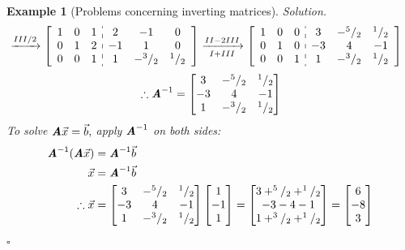 \documentclass[12pt, a4paper]{article}
\newtheorem{eg}{Example}[subsection]
\newenvironment*{sol}{\indent\textit{Solution. }}{\hfill{$\square$}\par}
\def\vecx{\vec{x}}
\def\vecb{\vec{b}}
\def\matrixA{\textbf{\emph{A}}}
\begin{document}
\begin{eg}[Problems concerning inverting matrices]
\begin{sol}
$$\begin{aligned}
			&\xrightarrow[]{III/2}\left[\begin{array}{c:c}\begin{matrix}1&0&1\\0&1&2\\0&0&1\end{matrix}&\begin{matrix}2&-1&0\\-1&1&0\\1&-^3/_2&^1/_2\end{matrix}\end{array}\right]\xrightarrow[I+III]{II-2III}\left[\begin{array}{c:c}\begin{matrix}1&0&0\\0&1&0\\0&0&1\end{matrix}&\begin{matrix}3&-^5/_2&^1/_2\\-3&4&-1\\1&-^3/_2&^1/_2\end{matrix}\end{array}\right]
		\end{aligned}$$
		\[\therefore\matrixA^{-1}=\begin{bmatrix}3&-^5/_2&^1/_2\\-3&4&-1\\1&-^3/_2&^1/_2\end{bmatrix}\]
		To solve $\matrixA\vecx=\vecb,$ apply $\matrixA^{-1}$ on both sides: 
		$$\begin{aligned}
		\matrixA^{-1}(\matrixA\vecx)&=\matrixA^{-1}\vecb\\
		\vecx&=\matrixA^{-1}\vecb\\
		\therefore\vecx&=\begin{bmatrix}3&-^5/_2&^1/_2\\-3&4&-1\\1&-^3/_2&^1/_2\end{bmatrix}\begin{bmatrix}1\\-1\\1\end{bmatrix}=\begin{bmatrix}3+^5/_2+^1/_2\\-3-4-1\\1+^3/_2+^1/_2\end{bmatrix}=\begin{bmatrix}6\\-8\\3\end{bmatrix}
		\end{aligned}$$
	\end{sol}
\end{eg}
\end{document}
